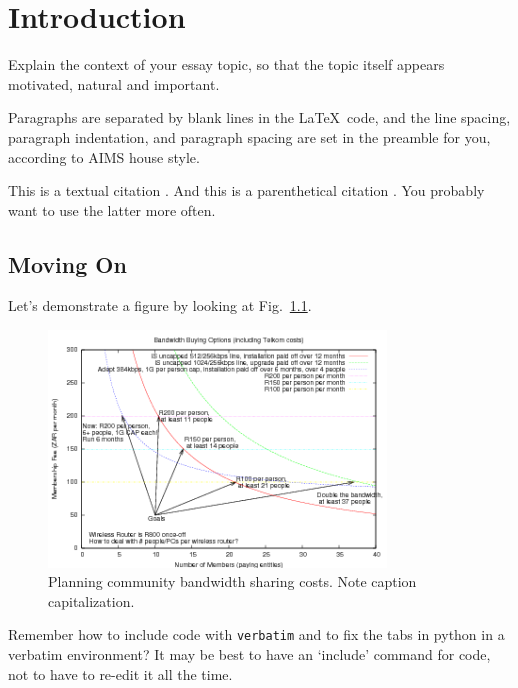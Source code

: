 \chapter{Introduction}

Explain the context of your essay topic, so that the
topic itself appears motivated, natural and important.

Paragraphs are separated by blank lines in the \LaTeX\ code, 
and the line spacing, paragraph indentation,
and paragraph spacing are set in the preamble for you, 
according to AIMS house style.

This is a textual citation \citet{shannon44}. And this is a parenthetical citation \citep{shannon44}. You probably want to use the latter more often.

\section{Moving On}
Let's demonstrate a figure by looking at Fig.\ \ref{bandwidth}. 

\begin{figure}[!h]
\centering 
\includegraphics[width=0.8\textwidth]{images/bandwidth-colour.png}
\caption{Planning community bandwidth sharing costs. 
  Note caption capitalization.}
\label{bandwidth} 
\end{figure}

Remember how to include code with {\tt verbatim} 
and to fix the tabs in {\sf python} in a verbatim environment? 
It may be best to have an `include' command for code, 
not to have to re-edit it all the time.


